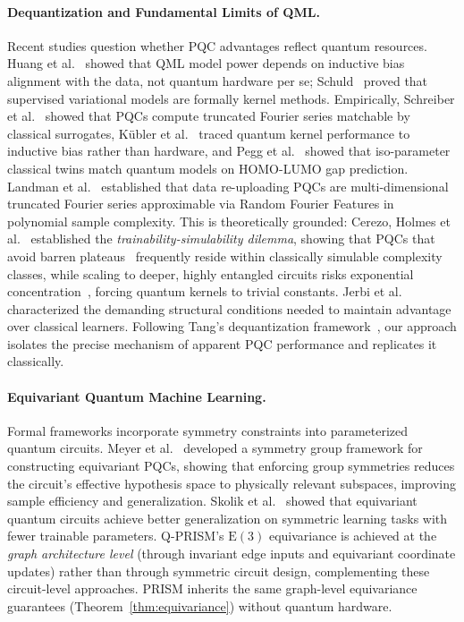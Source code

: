 \documentclass[10pt,twocolumn,letterpaper]{article}
\begin{document}
\paragraph{Dequantization and Fundamental Limits of QML.}
Recent studies question whether PQC advantages reflect quantum resources. Huang et al.~\cite{Huang:2021qml} showed that QML model power depends on inductive bias alignment with the data, not quantum hardware per se; Schuld~\cite{Schuld:2021kernel} proved that supervised variational models are formally kernel methods. Empirically, Schreiber et al.~\cite{Schreiber:2022roq} showed that PQCs compute truncated Fourier series matchable by classical surrogates, K\"ubler et al.~\cite{kubler2021inductive} traced quantum kernel performance to inductive bias rather than hardware, and Pegg et al.~\cite{pegg2026isoqgnn} showed that iso-parameter classical twins match quantum models on HOMO-LUMO gap prediction. Landman et al.~\cite{landman2023approximating} established that data re-uploading PQCs are multi-dimensional truncated Fourier series approximable via Random Fourier Features in polynomial sample complexity. This is theoretically grounded: Cerezo, Holmes et al.~\cite{Cerezo:2023nqf} established the \textit{trainability-simulability dilemma}, showing that PQCs that avoid barren plateaus~\cite{Cerezo:2020mtn, McClean:2018jps} frequently reside within classically simulable complexity classes, while scaling to deeper, highly entangled circuits risks exponential concentration~\cite{Thanasilp:2022agd}, forcing quantum kernels to trivial constants. Jerbi et al.~\cite{Jerbi:2021qnz} characterized the demanding structural conditions needed to maintain advantage over classical learners. Following Tang's dequantization framework~\cite{Tang:2018lmw}, our approach isolates the precise mechanism of apparent PQC performance and replicates it classically.

\paragraph{Equivariant Quantum Machine Learning.}
Formal frameworks incorporate symmetry constraints into parameterized quantum circuits.
Meyer et al.~\cite{meyer2023exploiting} developed a symmetry group framework for constructing equivariant PQCs, showing that enforcing group symmetries reduces the circuit's effective hypothesis space to physically relevant subspaces, improving sample efficiency and generalization.
Skolik et al.~\cite{skolik2023equivariant} showed that equivariant quantum circuits achieve better generalization on symmetric learning tasks with fewer trainable parameters.
Q-PRISM's $\mathrm{E}(3)$ equivariance is achieved at the \textit{graph architecture level} (through invariant edge inputs and equivariant coordinate updates) rather than through symmetric circuit design, complementing these circuit-level approaches. PRISM inherits the same graph-level equivariance guarantees (Theorem~\ref{thm:equivariance}) without quantum hardware.
\end{document}
